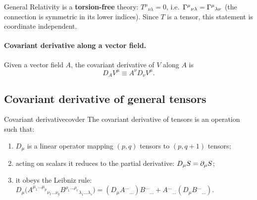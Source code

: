 \begin{keyresult}
General Relativity is a \textbf{torsion-free} theory: $T^\mu{}_{\nu\lambda}=0$, i.e.\ $\Gamma^{\mu}{}_{\nu\lambda}=\Gamma^{\mu}{}_{\lambda\nu}$ (the connection is symmetric in its lower indices). Since $T$ is a tensor, this statement is coordinate independent.
\end{keyresult}

\paragraph{Covariant derivative along a vector field.} Given a vector field $A$, the covariant derivative of $V$ along $A$ is
\begin{equation}
  D_AV^\mu\equiv A^\nu D_\nu V^\mu .
\end{equation}

\subsection{Covariant derivative of general tensors}

\begin{definition}{Covariant derivative}{covder}
The covariant derivative of tensors is an operation such that:
\begin{enumerate}[nosep]
\item $D_\mu$ is a linear operator mapping $(p,q)$ tensors to $(p,q+1)$ tensors;
\item acting on scalars it reduces to the partial derivative: $D_\mu S=\partial_\mu S$;
\item it obeys the Leibniz rule:
$D_\mu\big(A^{\mu_1\dots\mu_p}{}_{\nu_1\dots\nu_q}B^{\rho_1\dots\rho_r}{}_{\lambda_1\dots\lambda_s}\big)
=(D_\mu A^{\dots}{}_{\dots})B^{\dots}{}_{\dots}+A^{\dots}{}_{\dots}(D_\mu B^{\dots}{}_{\dots})$.
\end{enumerate}
\end{definition}

